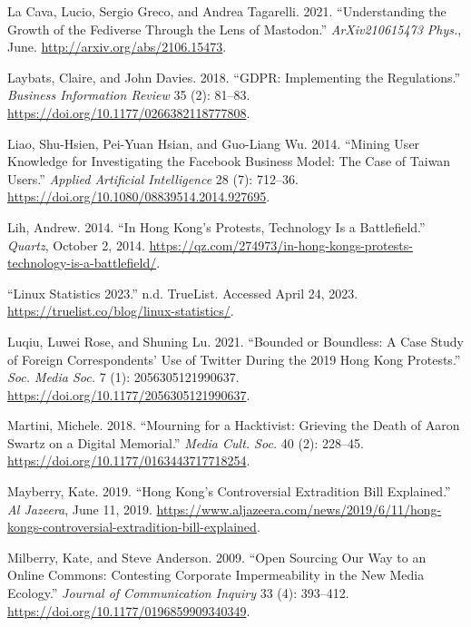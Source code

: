 \documentclass[
  a4paper,
]{book}
\newlength{\cslhangindent}
\newlength{\cslentryspacingunit} %
\newenvironment{CSLReferences}[2] %
 {%
  \setlength{\parindent}{0pt}
  \ifodd #1
  \let\oldpar\par
  \def\par{\hangindent=\cslhangindent\oldpar}
  \fi
  \setlength{\parskip}{#2\cslentryspacingunit}
 }%
 {}
\begin{document}
\begin{CSLReferences}{1}{0}
\hypertarget{ref-lacavaUnderstandingGrowthFediverse2021}{}
La Cava, Lucio, Sergio Greco, and Andrea Tagarelli. 2021. {``Understanding the Growth of the {Fediverse} Through the Lens of {Mastodon}.''} \emph{ArXiv210615473 Phys.}, June. \url{http://arxiv.org/abs/2106.15473}.

\hypertarget{ref-laybatsGDPRImplementingRegulations2018}{}
Laybats, Claire, and John Davies. 2018. {``{GDPR}: {Implementing} the Regulations.''} \emph{Business Information Review} 35 (2): 81--83. \url{https://doi.org/10.1177/0266382118777808}.

\hypertarget{ref-liaoMiningUserKnowledge2014}{}
Liao, Shu-Hsien, Pei-Yuan Hsian, and Guo-Liang Wu. 2014. {``Mining {User Knowledge} for {Investigating} the {Facebook Business Model}: {The Case} of {Taiwan Users}.''} \emph{Applied Artificial Intelligence} 28 (7): 712--36. \url{https://doi.org/10.1080/08839514.2014.927695}.

\hypertarget{ref-lihHongKongProtests2014}{}
Lih, Andrew. 2014. {``In {Hong Kong}'s Protests, Technology Is a Battlefield.''} \emph{Quartz}, October 2, 2014. \url{https://qz.com/274973/in-hong-kongs-protests-technology-is-a-battlefield/}.

\hypertarget{ref-LinuxStatistics2023}{}
{``Linux {Statistics} 2023.''} n.d. {TrueList}. Accessed April 24, 2023. \url{https://truelist.co/blog/linux-statistics/}.

\hypertarget{ref-luqiuBoundedBoundlessCase2021}{}
Luqiu, Luwei Rose, and Shuning Lu. 2021. {``Bounded or {Boundless}: {A Case Study} of {Foreign Correspondents}' {Use} of {Twitter During} the 2019 {Hong Kong Protests}.''} \emph{Soc. Media Soc.} 7 (1): 2056305121990637. \url{https://doi.org/10.1177/2056305121990637}.

\hypertarget{ref-martiniMourningHacktivistGrieving2018}{}
Martini, Michele. 2018. {``Mourning for a Hacktivist: Grieving the Death of {Aaron Swartz} on a Digital Memorial.''} \emph{Media Cult. Soc.} 40 (2): 228--45. \url{https://doi.org/10.1177/0163443717718254}.

\hypertarget{ref-mayberryHongKongControversial2019}{}
Mayberry, Kate. 2019. {``Hong {Kong}'s Controversial Extradition Bill Explained.''} \emph{Al Jazeera}, June 11, 2019. \url{https://www.aljazeera.com/news/2019/6/11/hong-kongs-controversial-extradition-bill-explained}.

\hypertarget{ref-milberryOpenSourcingOur2009}{}
Milberry, Kate, and Steve Anderson. 2009. {``Open {Sourcing Our Way} to an {Online Commons}: {Contesting Corporate Impermeability} in the {New Media Ecology}.''} \emph{Journal of Communication Inquiry} 33 (4): 393--412. \url{https://doi.org/10.1177/0196859909340349}.


\end{CSLReferences}
\end{document}
